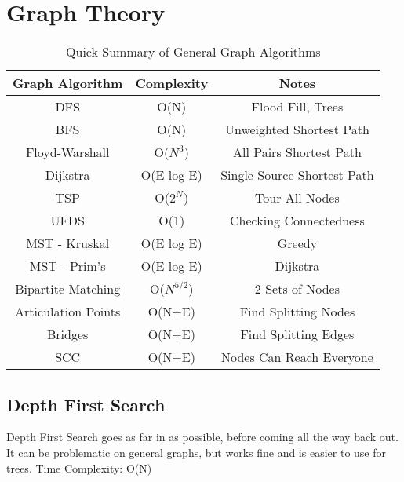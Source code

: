 \documentclass{article}
\begin{document}
\section{Graph Theory}
\begin{table}[H]
\begin{tabular}{|c|c|c|}
\hline
Graph Algorithm     & Complexity   & Notes                       \\ \hline
DFS                 & O(N)         & Flood Fill, Trees           \\ \hline
BFS                 & O(N)         & Unweighted Shortest Path    \\ \hline
Floyd-Warshall      & O($N^{3}$)   & All Pairs Shortest Path     \\ \hline
Dijkstra            & O(E log E)   & Single Source Shortest Path \\ \hline
TSP                 & O($2^{N}$)   & Tour All Nodes              \\ \hline
UFDS                & O(1)         & Checking Connectedness      \\ \hline
MST - Kruskal       & O(E log E)   & Greedy                      \\ \hline
MST - Prim's        & O(E log E)   & Dijkstra                    \\ \hline
Bipartite Matching  & O($N^{5/2}$) & 2 Sets of Nodes             \\ \hline
Articulation Points & O(N+E)       & Find Splitting Nodes        \\ \hline
Bridges             & O(N+E)       & Find Splitting Edges        \\ \hline
SCC                 & O(N+E)       & Nodes Can Reach Everyone    \\ \hline
\end{tabular}
\caption{Quick Summary of General Graph Algorithms}
\label{tab:gt}
\end{table}

\subsection{Depth First Search}
\begin{flushleft}
Depth First Search goes as far in as possible, before coming all the way back out.
It can be problematic on general graphs, but works fine and is easier to use for trees.
\newline
Time Complexity: O(N)
\end{flushleft}

\end{document}
